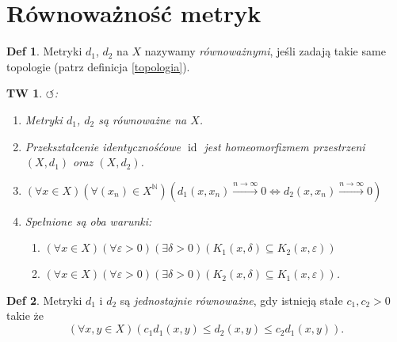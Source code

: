\documentclass[a4paper, 12pt]{mwart}
\theoremstyle{definition}
\newtheorem{definicja}{Def}[section]
\theoremstyle{plain}
\newtheorem{twierdzenie}{TW}[section]
\theoremstyle{remark}
\begin{document}
\section{Równoważność metryk}
\begin{definicja}
	Metryki $d_1$, $d_2$ na $X$ nazywamy \emph{równoważnymi}, jeśli zadają takie same topologie (patrz definicja \ref{topologia}).
\end{definicja}
\begin{twierdzenie}
	$\circlearrowleft$:
	\begin{enumerate}
		\item Metryki $d_1$, $d_2$ są równoważne na $X$.
		\item Przekształcenie identycznośćowe $\operatorname{id}$ jest homeomorfizmem przestrzeni $(X, d_1)$ oraz $(X, d_2)$.
		\item $\left(\forall x \in X\right)\left(\forall (x_n) \in X^\mathbb{N}\right)\left(d_1(x, x_n) \overset{n \to \infty}{\longrightarrow} 0 \iff d_2(x, x_n) \overset{n \to \infty}{\longrightarrow} 0\right)$
		\item Spełnione są oba warunki:
		\begin{enumerate}
			\item $\left(\forall x \in X\right)\left(\forall \varepsilon > 0\right)\left(\exists \delta > 0\right)\left(K_1(x, \delta) \subseteq K_2(x, \varepsilon)\right)$
			\item $\left(\forall x \in X\right)\left(\forall \varepsilon > 0\right)\left(\exists \delta > 0\right)\left(K_2(x, \delta) \subseteq K_1(x, \varepsilon)\right)$.
		\end{enumerate}
	\end{enumerate}
\end{twierdzenie}
\begin{definicja}
	Metryki $d_1$ i $d_2$ są \emph{jednostajnie równoważne}, gdy istnieją stałe $c_1, c_2 > 0$ takie że
	\begin{equation}
		\left(\forall x, y \in X\right)\left(c_1 d_1(x, y) \leq d_2(x, y) \leq c_2 d_1(x,y)\right).
	\end{equation}
\end{definicja}
\end{document}

